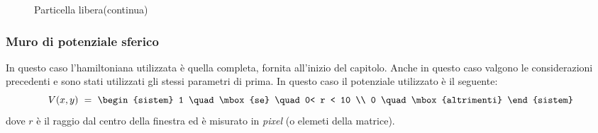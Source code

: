 \begin{figure}[!h]
 \centering
 \caption{\small{Particella libera(continua)}}
 \end{figure}

  \subsubsection{Muro di potenziale sferico}
In questo caso l'hamiltoniana utilizzata è quella completa, fornita all'inizio del capitolo. Anche in questo caso valgono le considerazioni precedenti e sono stati utilizzati gli stessi parametri di prima.
In questo caso il potenziale utilizzato è il seguente:
$$
V(x,y) \ = \ \begin{sistem}
              1 \quad \mbox{se} \quad  0< r < 10 \\
              0 \quad \mbox{altrimenti}
             \end{sistem}
$$
dove $r$ è il raggio dal centro della finestra ed è misurato in \emph{pixel} (o elemeti della matrice).

